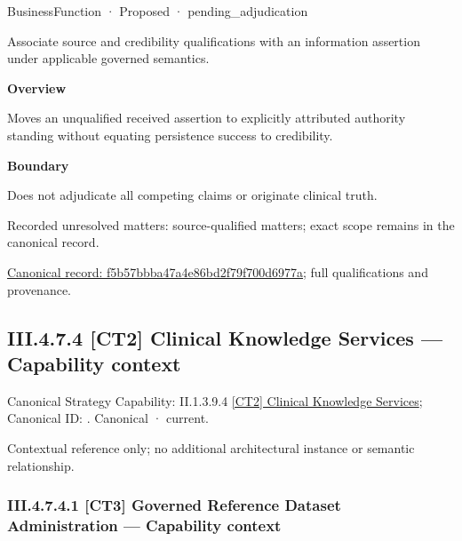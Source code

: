 \label{element:f5b57bbba47a4e86bd2f79f700d6977a}
{\small BusinessFunction · Proposed · pending\_adjudication}\par

Associate source and credibility qualifications with an information assertion under applicable governed semantics.



\textbf{Overview}



Moves an unqualified received assertion to explicitly attributed authority standing without equating persistence success to credibility.



\textbf{Boundary}



Does not adjudicate all competing claims or originate clinical truth.


{\small Recorded unresolved matters: source-qualified matters; exact scope remains in the canonical record.}\par
{\footnotesize \href{../../../../continuum/business/business-function/f5b57bbba47a4e86bd2f79f700d6977a.md}{Canonical record: f5b57bbba47a4e86bd2f79f700d6977a}; full qualifications and provenance.}\par
\subsection*{III.4.7.4 [CT2] Clinical Knowledge Services — Capability context}
\label{navigation:III.4.7.4}

{\small Canonical Strategy Capability: II.1.3.9.4 \hyperref[element:bbd2bd21859f40e39963bdbe7a851686]{[CT2] Clinical Knowledge Services}; Canonical ID: \texttt{}. Canonical · current.}\par
Contextual reference only; no additional architectural instance or semantic relationship.\par
\subsubsection*{III.4.7.4.1 [CT3] Governed Reference Dataset Administration — Capability context}
\label{navigation:III.4.7.4.1}

